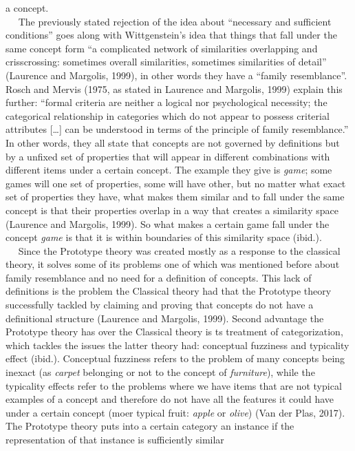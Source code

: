 \documentclass[11pt]{article}
\begin{document}
a concept.\\
   The previously stated rejection of the idea about ``necessary and
sufficient conditions'' goes along with Wittgenstein's idea that things
that fall under the same concept form ``a complicated network of
similarities overlapping and crisscrossing: sometimes overall
similarities, sometimes similarities of detail'' (Laurence and Margolis,
1999), in other words they have a ``family resemblance''. Rosch and
Mervis (1975, as stated in Laurence and Margolis, 1999) explain this
further: ``formal criteria are neither a logical nor psychological
necessity; the categorical relationship in categories which do not
appear to possess criterial attributes {[}\ldots{}{]} can be understood
in terms of the principle of family resemblance.'' In other words, they
all state that concepts are not governed by definitions but by a unfixed
set of properties that will appear in different combinations with
different items under a certain concept. The example they give is
\emph{game}; some games will one set of properties, some will have
other, but no matter what exact set of properties they have, what makes
them similar and to fall under the same concept is that their properties
overlap in a way that creates a similarity space (Laurence and Margolis,
1999). So what makes a certain game fall under the concept \emph{game}
is that it is within boundaries of this similarity space (ibid.).\\
   Since the Prototype theory was created mostly as a response to the
classical theory, it solves some of its problems one of which was
mentioned before about family resemblance and no need for a definition
of concepts. This lack of definitions is the problem the Classical
theory had that the Prototype theory successfully tackled by claiming
and proving that concepts do not have a definitional structure (Laurence
and Margolis, 1999). Second advantage the Prototype theory has over the
Classical theory is ts treatment of categorization, which tackles the
issues the latter theory had: conceptual fuzziness and typicality effect
(ibid.). Conceptual fuzziness refers to the problem of many concepts
being inexact (as \emph{carpet} belonging or not to the concept of
\emph{furniture}), while the typicality effects refer to the problems
where we have items that are not typical examples of a concept and
therefore do not have all the features it could have under a certain
concept (moer typical fruit: \emph{apple} or \emph{olive}) (Van der
Plas, 2017). The Prototype theory puts into a certain category an
instance if the representation of that instance is sufficiently similar
\end{document}
